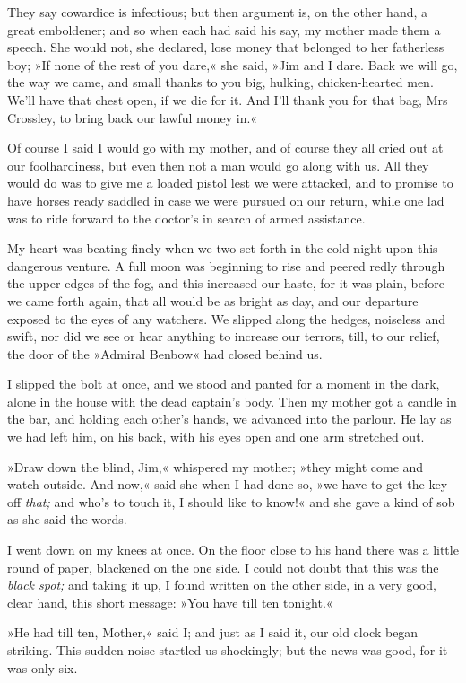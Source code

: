 They say cowardice is infectious; but then argument is, on the other hand, a great emboldener; and so when each had said his say, my mother made them a speech. She would not, she declared, lose money that belonged to her fatherless boy; »If none of the rest of you dare,« she said, »Jim and I dare. Back we will go, the way we came, and small thanks to you big, hulking, chicken-hearted men. We'll have that chest open, if we die for it. And I'll thank you for that bag, Mrs Crossley, to bring back our lawful money in.«

Of course I said I would go with my mother, and of course they all cried out at our foolhardiness, but even then not a man would go along with us. All they would do was to give me a loaded pistol lest we were attacked, and to promise to have horses ready saddled in case we were pursued on our return, while one lad was to ride forward to the doctor's in search of armed assistance.

My heart was beating finely when we two set forth in the cold night upon this dangerous venture. A full moon was beginning to rise and peered redly through the upper edges of the fog, and this increased our haste, for it was plain, before we came forth again, that all would be as bright as day, and our departure exposed to the eyes of any watchers. We slipped along the hedges, noiseless and swift, nor did we see or hear anything to increase our terrors, till, to our relief, the door of the »Admiral Benbow« had closed behind us.

I slipped the bolt at once, and we stood and panted for a moment in the dark, alone in the house with the dead captain's body. Then my mother got a candle in the bar, and holding each other's hands, we advanced into the parlour. He lay as we had left him, on his back, with his eyes open and one arm stretched out.

»Draw down the blind, Jim,« whispered my mother; »they might come and watch outside. And now,« said she when I had done so, »we have to get the key off \textit{that;} and who's to touch it, I should like to know!« and she gave a kind of sob as she said the words.

I went down on my knees at once. On the floor close to his hand there was a little round of paper, blackened on the one side. I could not doubt that this was the \textit{black spot;} and taking it up, I found written on the other side, in a very good, clear hand, this short message: »You have till ten tonight.«

»He had till ten, Mother,« said I; and just as I said it, our old clock began striking. This sudden noise startled us shockingly; but the news was good, for it was only six.

